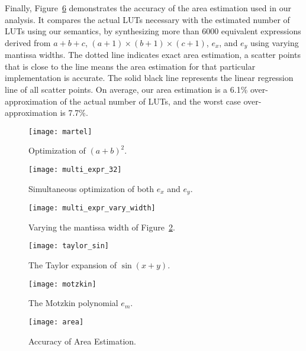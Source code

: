 Finally, Figure~\ref{so:fig:area} demonstrates the accuracy of the area estimation
used in our analysis. It compares the actual LUTs necessary with the estimated
number of LUTs using our semantics, by synthesizing more than 6000 equivalent
expressions derived from $a + b + c$, $(a + 1) \times (b + 1) \times (c + 1)$,
$e_x$, and $e_y$ using varying mantissa widths. The dotted line indicates exact
area estimation, a scatter points that is close to the line means the area
estimation for that particular implementation is accurate. The solid black line
represents the linear regression line of all scatter points. On average, our
area estimation is a 6.1\% over-approximation of the actual number of LUTs, and
the worst case over-approximation is 7.7\%.
\newcommand{\figsize}{0.5}
\begin{figure}[ht]
    \centering
    \texttt{[image: martel]}
    \caption{Optimization of ${(a + b)}^2$.}\label{so:fig:martel}
\end{figure}
\begin{figure}[ht]
    \centering
    \texttt{[image: multi\_expr\_32]}
    \caption{Simultaneous optimization of both $e_x$ and $e_y$.}
    {}\label{so:fig:multi_expr_32}
\end{figure}
\begin{figure}[ht]
    \centering
    \texttt{[image: multi\_expr\_vary\_width]}
    \caption{Varying the mantissa width of Figure~\ref{so:fig:multi_expr_32}.}
    {}\label{so:fig:multi_expr_vary_width}
\end{figure}
\begin{figure}[ht]
    \centering
    \texttt{[image: taylor\_sin]}
    \caption{The Taylor expansion of $\sin(x + y)$.}
    {}\label{so:fig:taylor_sin}
\end{figure}
\begin{figure}[ht]
    \centering
    \texttt{[image: motzkin]}
    \caption{The Motzkin polynomial $e_m$.}\label{so:fig:motzkin}
\end{figure}
\begin{figure}[ht]
    \centering
    \texttt{[image: area]}
    \caption{Accuracy of Area Estimation.}\label{so:fig:area}
\end{figure}
